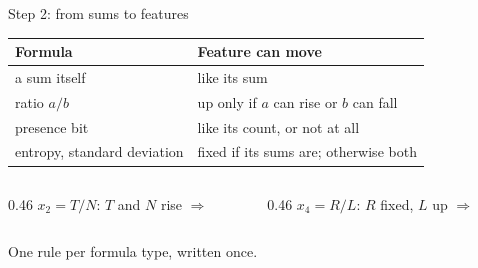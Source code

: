 \documentclass[aspectratio=169,11pt]{beamer}
\begin{document}
\begin{frame}{Step 2: from sums to features}
  \renewcommand{\arraystretch}{1.35}
  \begin{center}
    \begin{tabular}{@{}ll@{}}
      \toprule
      \textbf{Formula} & \textbf{Feature can move} \\
      \midrule
      a sum itself & like its sum \\
      ratio $a / b$ & up only if $a$ can rise or $b$ can fall \\
      presence bit & like its count, or not at all \\
      entropy, standard deviation & fixed if its sums are; otherwise both \\
      \bottomrule
    \end{tabular}
  \end{center}
  \vfill
  \begin{columns}[T]
    \begin{column}{0.46\textwidth}
      $x_2 = T / N$: $T$ and $N$ rise $\Rightarrow$ \both
    \end{column}
    \begin{column}{0.46\textwidth}
      $x_4 = R / L$: $R$ fixed, $L$ up $\Rightarrow$ \down
    \end{column}
  \end{columns}
  \vfill
  \begin{center}
    One rule per formula type, written once.
  \end{center}
\end{frame}
\end{document}
